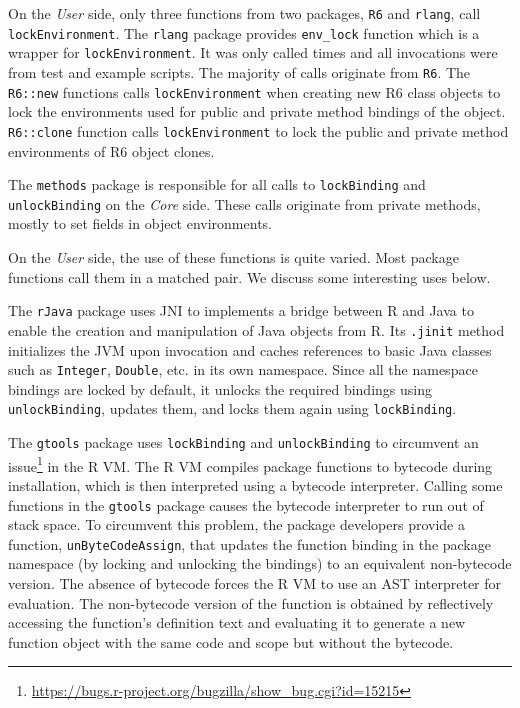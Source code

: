 \documentclass[10pt,review,sigplan,authorversion=true]{acmart}
\renewcommand{\c}[1]{\lstinline |#1|\xspace}
\begin{document}
On the \emph{User} side, only three functions from two packages, \c{R6} and
\c{rlang}, call \c{lockEnvironment}. The \c{rlang} package provides \c{env_lock}
function which is a wrapper for \c{lockEnvironment}. It was only called
\LockEnvironmentRlangCallCount times and all invocations were from test and
example scripts. The majority of calls originate from \c{R6}. The \c{R6::new}
functions calls \c{lockEnvironment} when creating new R6 class objects to lock
the environments used for public and private method bindings of the object.
\c{R6::clone} function calls \c{lockEnvironment} to lock the public and private
method environments of R6 object clones.

The \c{methods} package is responsible for all calls to \c{lockBinding} and
\c{unlockBinding} on the \emph{Core} side. These calls originate from private
methods, mostly to set fields in object environments.

On the \emph{User} side, the use of these functions is quite varied. Most
package functions call them in a matched pair. We discuss some interesting uses
below.

The \c{rJava} package uses JNI to implements a bridge between R and Java to
enable the creation and manipulation of Java objects from R. Its \c{.jinit}
method initializes the JVM upon invocation and caches references to basic Java
classes such as \c{Integer}, \c{Double}, etc. in its own namespace. Since all
the namespace bindings are locked by default, it unlocks the required bindings
using \c{unlockBinding}, updates them, and locks them again using
\c{lockBinding}.

The \c{gtools} package uses \c{lockBinding} and \c{unlockBinding} to circumvent
an
issue\footnote{\url{https://bugs.r-project.org/bugzilla/show_bug.cgi?id=15215}}
in the R VM. The R VM compiles package functions to bytecode during
installation, which is then interpreted using a bytecode interpreter. Calling
some functions in the \c{gtools} package causes the bytecode interpreter to run
out of stack space. To circumvent this problem, the package developers provide a
function, \c{unByteCodeAssign}, that updates the function binding in the package
namespace (by locking and unlocking the bindings) to an equivalent non-bytecode
version. The absence of bytecode forces the R VM to use an AST interpreter for
evaluation. The non-bytecode version of the function is obtained by reflectively
accessing the function's definition text and evaluating it to generate a new
function object with the same code and scope but without the bytecode.
\end{document}

